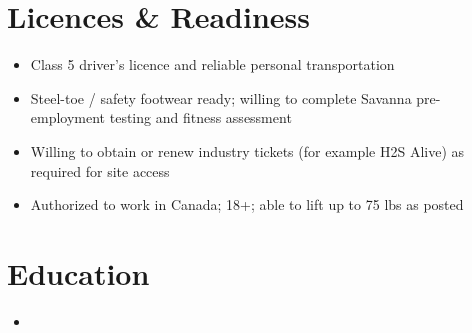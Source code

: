 \documentclass[11pt,a4paper,sans]{moderncv}
\begin{document}
\section{Licences \& Readiness}
\vspace{1pt}
\begin{itemize}
\item Class 5 driver's licence and reliable personal transportation
\item Steel-toe / safety footwear ready; willing to complete Savanna pre-employment testing and fitness assessment
\item Willing to obtain or renew industry tickets (for example H2S Alive) as required for site access
\item Authorized to work in Canada; 18+; able to lift up to 75 lbs as posted
\end{itemize}

\section{Education}
\vspace{1pt}
\begin{itemize}
\item{}
\end{itemize}
\end{document}
